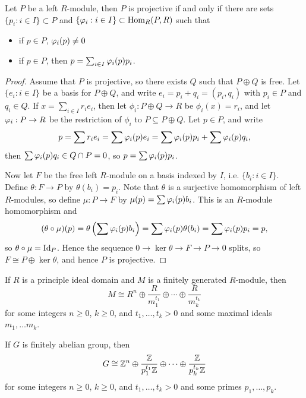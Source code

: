   \begin{thm}
    Let $P$ be a left $R$-module, then $P$ is projective
    if and only if there are sets $\{p_i:i\in I\}\subset P$ and
    $\{\varphi_i: i\in I\} \subset \operatorname{Hom}_R(P,R)$ such that
    \begin{itemize}
      \item if $p\in P$, $\varphi_i(p)\neq 0$
      \item if $p\in P$, then $p = \sum_{i\in I}\varphi_i(p)p_i$.
    \end{itemize}
  \end{thm}
  \begin{proof}
    Assume that $P$ is projective, so there exists $Q$ such that $P\oplus Q$
    is free. Let $\{e_i:i\in I\}$ be a basis for $P\oplus Q$, and write
    $e_i = p_i+q_i=(p_i,q_i)$ with $p_i \in P$ and $q_i \in Q$. If
    $x = \sum_{i\in I}r_ie_i$, then let $\phi_i:P\oplus Q\to R$ be
    $\phi_i(x) = r_i$, and let $\varphi_i:P\to R$ be the restriction of $\phi_i$
    to $P\subseteq P\oplus Q$. Let $p\in P$, and write
    \[ p=\sum r_ie_i=\sum \varphi_i(p)e_i=\sum\varphi_i(p)p_i + \sum \varphi_i(p)q_i, \]
    then $\sum \varphi_i(p)q_i \in Q\cap P = 0$, so $p = \sum \varphi_i(p)p_i$.

    Now let $F$ be the free left $R$-module on a basis indexed by $I$, i.e.
    $\{ b_i: i\in I\}$. Define $\theta:F\to P$ by $\theta(b_i) = p_i$. Note
    that $\theta$ is a surjective homomorphism of left $R$-modules, so define
    $\mu:P\to F$ by $\mu(p) = \sum \varphi_i(p)b_i$. This is an $R$-module
    homomorphism and
    \[ (\theta\circ \mu)(p) = \theta\left(\sum \varphi_i(p)b_i\right) = \sum\varphi_i(p)\theta(b_i) = \sum\varphi_i(p)p_i = p,\]
    so $\theta\circ \mu = \operatorname{Id}_P$. Hence the sequence
    $0\to\ker\theta\to F\to P\to 0$ splits, so $F\cong P\oplus \ker\theta$,
    and hence $P$ is projective.
  \end{proof}

  \begin{thm}
    If $R$ is a principle ideal domain and $M$ is a finitely generated
    $R$-module, then
    \[ M\cong R^n\oplus \frac{R}{m_1^{t_1}}\oplus \cdots \oplus \frac{R}{m_k^{t_k}} \]
    for some integers $n\geq 0$, $k\geq 0$, and $t_1,\ldots,t_k>0$ and some
    maximal ideals $m_1,\ldots m_k$.
  \end{thm}

  \begin{cor}
    If $G$ is finitely abelian group, then
    \[ G \cong \mathbb{Z}^n \oplus \frac{\mathbb{Z}}{p_1^{t_1}\mathbb{Z}} \oplus \cdots \oplus \frac{\mathbb{Z}}{p_k^{t_k}\mathbb{Z}} \]
    for some integers $n\geq 0$, $k\geq 0$, and $t_1,\ldots,t_k>0$ and some
    primes $p_1,\ldots,p_k$.
  \end{cor}

